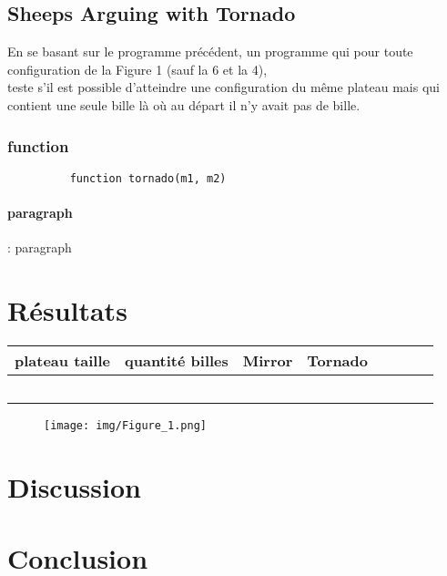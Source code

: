 \documentclass[utf8]{article}
\begin{document}
\subsection{ Sheeps Arguing with Tornado }
En se basant sur le programme précédent, 
un programme qui pour toute configuration de la Figure 1 (sauf la 6 et la
4), \\
teste s’il est possible d’atteindre une configuration du même plateau
mais qui contient une seule bille là où au départ il n’y avait pas de bille.\\


\subsubsection{function}

\begin{figure}[H]
\begin{minipage}{\textwidth}
  \centering	
	\begin{lstlisting}
	function tornado(m1, m2) 
    \end{lstlisting}
  \label{fig:code_exemple}
\end{minipage}
\end{figure}

\paragraph{paragraph}:
    paragraph
    
  

\section{Résultats}
\begin{center}
\begin{tabular}{|c|c|c|c|
                |c|c|c|c|}
\hline
plateau taille & quantité billes & Mirror & Tornado \\
\hline
              &                &       &\\
             &                &               & \\
             &                &               & \\
             &                &               & \\
\hline
             &                &              & \\
\hline
\end{tabular}
\end{center}



\begin{figure}[H]
  \centering
	\texttt{[image: img/Figure\_1.png]}
  \label{fig:logo}
\end{figure}

\newpage

\section{Discussion}
    

\section{Conclusion}
\end{document}
